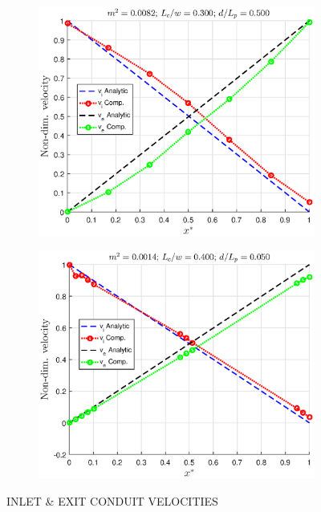 \documentclass[twocolumn,10pt,cleanfoot]{ihmtc}
\begin{document}
\begin{figure}
\centering
   \begin{subfigure}[b]{0.55\textwidth}
   \includegraphics[height=0.55\linewidth,width=0.90\linewidth]{velvalid_a.eps}
    \caption{} 
   \label{velvalid_a} 
\end{subfigure}
%
%
%
   \begin{subfigure}[b]{0.55\textwidth}
   \includegraphics[height=0.55\linewidth,width=0.90\linewidth]{velvalid_c.eps}
   \caption{}
   \label{velvalid_c} 
\end{subfigure}
%
\vspace{-3em}
\caption{INLET \& EXIT CONDUIT VELOCITIES}
\vspace{-3em}
\end{figure}
%
%
\end{document}
